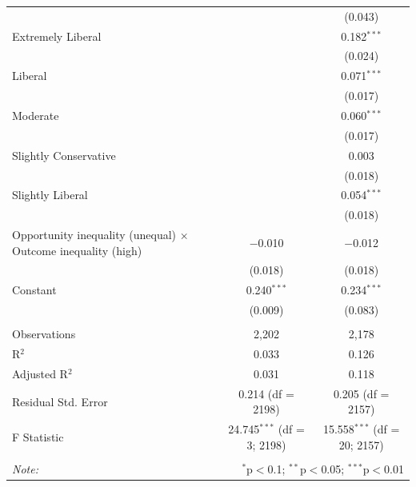\begin{table}[H]
\begin{tabular}{@{\extracolsep{5pt}}lcc}
  &  & (0.043) \\ 
  Extremely Liberal &  & 0.182$^{***}$ \\ 
  &  & (0.024) \\ 
  Liberal &  & 0.071$^{***}$ \\ 
  &  & (0.017) \\ 
  Moderate &  & 0.060$^{***}$ \\ 
  &  & (0.017) \\ 
  Slightly Conservative &  & 0.003 \\ 
  &  & (0.018) \\ 
  Slightly Liberal &  & 0.054$^{***}$ \\ 
  &  & (0.018) \\ 
  Opportunity inequality (unequal) × Outcome inequality (high) & $-$0.010 & $-$0.012 \\ 
  & (0.018) & (0.018) \\ 
  Constant & 0.240$^{***}$ & 0.234$^{***}$ \\ 
  & (0.009) & (0.083) \\ 
 \hline \\[-1.8ex] 
Observations & 2,202 & 2,178 \\ 
R$^{2}$ & 0.033 & 0.126 \\ 
Adjusted R$^{2}$ & 0.031 & 0.118 \\ 
Residual Std. Error & 0.214 (df = 2198) & 0.205 (df = 2157) \\ 
F Statistic & 24.745$^{***}$ (df = 3; 2198) & 15.558$^{***}$ (df = 20; 2157) \\ 
\hline 
\hline \\[-1.8ex] 
\textit{Note:}  & \multicolumn{2}{r}{$^{*}$p$<$0.1; $^{**}$p$<$0.05; $^{***}$p$<$0.01} \\ 
\end{tabular} 
\end{table} 
